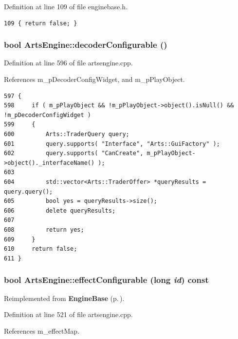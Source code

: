 Definition at line 109 of file enginebase.h.



\footnotesize\begin{verbatim}109 { return false; }
\end{verbatim}\normalsize 
{}
\subsubsection{\setlength{\rightskip}{0pt plus 5cm}bool Arts\-Engine::decoder\-Configurable ()}\label{classArtsEngine_ArtsEnginea17}




Definition at line 596 of file artsengine.cpp.

References m\_\-p\-Decoder\-Config\-Widget, and m\_\-p\-Play\-Object.



\footnotesize\begin{verbatim}597 {
598     if ( m_pPlayObject && !m_pPlayObject->object().isNull() && !m_pDecoderConfigWidget )
599     {
600         Arts::TraderQuery query;
601         query.supports( "Interface", "Arts::GuiFactory" );
602         query.supports( "CanCreate", m_pPlayObject->object()._interfaceName() );
603 
604         std::vector<Arts::TraderOffer> *queryResults = query.query();
605         bool yes = queryResults->size();
606         delete queryResults;
607 
608         return yes;
609     }
610     return false;
611 }
\end{verbatim}\normalsize 
{}
\subsubsection{\setlength{\rightskip}{0pt plus 5cm}bool Arts\-Engine::effect\-Configurable (long {\em id}) const\hspace{0.3cm}{\tt  [virtual]}}\label{classArtsEngine_ArtsEnginea13}




Reimplemented from {\bf Engine\-Base} {\rm (p.\,\pageref{classEngineBase_EngineBasea19})}.

Definition at line 521 of file artsengine.cpp.

References m\_\-effect\-Map.



